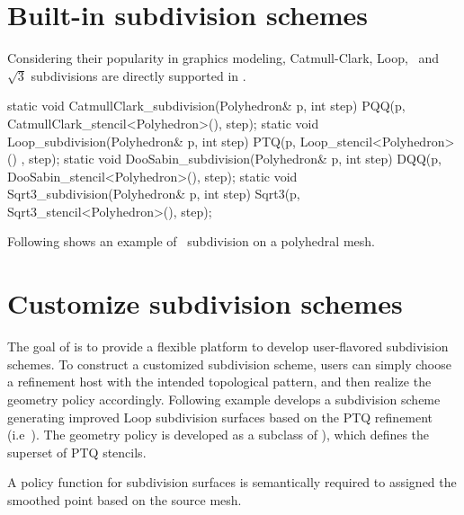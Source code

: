 



\section{Built-in subdivision schemes}
Considering their popularity in graphics modeling, 
Catmull-Clark, Loop, \DS\ and $\sqrt{3}$ subdivisions are directly
supported in . 

\begin{ccExampleCode}
  static void CatmullClark_subdivision(Polyhedron& p, int step) {
    PQQ(p, CatmullClark_stencil<Polyhedron>(), step);
  }
  static void Loop_subdivision(Polyhedron& p, int step) {
    PTQ(p, Loop_stencil<Polyhedron>() , step);
  }
  static void DooSabin_subdivision(Polyhedron& p, int step) {
    DQQ(p, DooSabin_stencil<Polyhedron>(), step);
  }
  static void Sqrt3_subdivision(Polyhedron& p, int step) {
    Sqrt3(p, Sqrt3_stencil<Polyhedron>(), step);
  }
\end{ccExampleCode}

Following shows an example of \DS\ subdivision on a polyhedral mesh.

\section{Customize subdivision schemes}
The goal of  is to provide a flexible platform
to develop user-flavored subdivision schemes.
To construct a customized subdivision scheme, users can simply 
choose a refinement host with the intended topological pattern, 
and then realize the geometry policy accordingly. 
Following example develops a subdivision scheme
generating improved Loop subdivision surfaces based on the PTQ 
refinement (i.e~). 
The geometry policy is developed as a subclass 
of ), which defines the superset of PTQ stencils.

A policy function for subdivision surfaces is semantically
required to assigned the smoothed point based on the source mesh.

